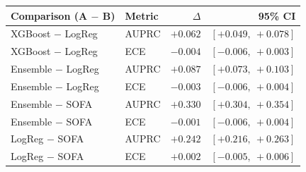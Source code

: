 \begin{tabular}{@{}llrr@{}}
\toprule
Comparison (A $-$ B) & Metric & $\Delta$ & 95\% CI \\
\midrule
XGBoost $-$ LogReg & AUPRC & $+0.062$ & $[+0.049,\ +0.078]$ \\
XGBoost $-$ LogReg & ECE & $-0.004$ & $[-0.006,\ +0.003]$ \\
Ensemble $-$ LogReg & AUPRC & $+0.087$ & $[+0.073,\ +0.103]$ \\
Ensemble $-$ LogReg & ECE & $-0.003$ & $[-0.006,\ +0.004]$ \\
Ensemble $-$ SOFA & AUPRC & $+0.330$ & $[+0.304,\ +0.354]$ \\
Ensemble $-$ SOFA & ECE & $-0.001$ & $[-0.006,\ +0.004]$ \\
LogReg $-$ SOFA & AUPRC & $+0.242$ & $[+0.216,\ +0.263]$ \\
LogReg $-$ SOFA & ECE & $+0.002$ & $[-0.005,\ +0.006]$ \\
\bottomrule
\end{tabular}
